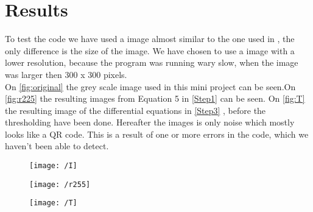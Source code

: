 \section{Results}
\label{Results}
To test the code we have used a image almost similar to the one used in \parencite{Baoming2016}, the only difference is the size of the image. We have chosen to use a image with a lower resolution, because the program was running wary slow, when the image was larger then 300 x 300 pixels. \\
On \autoref{fig:original} the grey scale image used in this mini project can be seen.On \autoref{fig:r225} the resulting images from Equation 5 in \autoref{Step1} can be seen. On \autoref{fig:T} the resulting image of the differential equations in \autoref{Step3} , before the thresholding have been done. Hereafter the images is only noise which mostly looks like a QR code. This is a result of one or more errors in the code, which we haven't been able to detect.
\begin{figure}[H]
	\centering
	\texttt{[image: /I]}
	\caption{}
	\label{fig:original}
\end{figure}
\noindent
\begin{figure}[H]
	\centering
	\texttt{[image: /r255]}
	\caption{}
	\label{fig:r225}
\end{figure}
\noindent
\begin{figure}[H]
	\centering
	\texttt{[image: /T]}
	\caption{}
	\label{fig:T}
\end{figure}
\noindent
